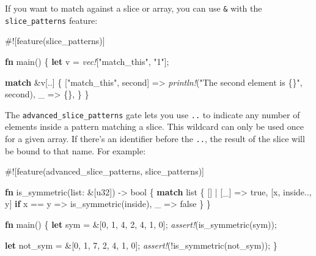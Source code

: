 \documentclass[a4paper,]{book}
\newenvironment{Shaded}{\begin{snugshade}}{\end{snugshade}}
\newcommand{\KeywordTok}[1]{\textcolor[rgb]{0.13,0.29,0.53}{\textbf{{#1}}}}
\newcommand{\DataTypeTok}[1]{\textcolor[rgb]{0.13,0.29,0.53}{{#1}}}
\newcommand{\DecValTok}[1]{\textcolor[rgb]{0.00,0.00,0.81}{{#1}}}
\newcommand{\ConstantTok}[1]{\textcolor[rgb]{0.00,0.00,0.00}{{#1}}}
\newcommand{\StringTok}[1]{\textcolor[rgb]{0.31,0.60,0.02}{{#1}}}
\newcommand{\PreprocessorTok}[1]{\textcolor[rgb]{0.56,0.35,0.01}{\textit{{#1}}}}
\newcommand{\AttributeTok}[1]{\textcolor[rgb]{0.77,0.63,0.00}{{#1}}}
\newcommand{\NormalTok}[1]{{#1}}
\begin{document}
If you want to match against a slice or array, you can use \texttt{\&}
with the \texttt{slice\_patterns} feature:

\begin{Shaded}
\begin{Highlighting}[]
\AttributeTok{#![}\NormalTok{feature}\AttributeTok{(}\NormalTok{slice_patterns}\AttributeTok{)]}

\KeywordTok{fn} \NormalTok{main() \{}
    \KeywordTok{let} \NormalTok{v = }\PreprocessorTok{vec!}\NormalTok{[}\StringTok{"match_this"}\NormalTok{, }\StringTok{"1"}\NormalTok{];}

    \KeywordTok{match} \NormalTok{&v[..] \{}
        \NormalTok{[}\StringTok{"match_this"}\NormalTok{, second] => }\PreprocessorTok{println!}\NormalTok{(}\StringTok{"The second element is \{\}"}\NormalTok{, second),}
        \NormalTok{_ => \{\},}
    \NormalTok{\}}
\NormalTok{\}}
\end{Highlighting}
\end{Shaded}

The \texttt{advanced\_slice\_patterns} gate lets you use \texttt{..} to
indicate any number of elements inside a pattern matching a slice. This
wildcard can only be used once for a given array. If there's an
identifier before the \texttt{..}, the result of the slice will be bound
to that name. For example:

\begin{Shaded}
\begin{Highlighting}[]
\AttributeTok{#![}\NormalTok{feature}\AttributeTok{(}\NormalTok{advanced_slice_patterns}\AttributeTok{,} \NormalTok{slice_patterns}\AttributeTok{)]}

\KeywordTok{fn} \NormalTok{is_symmetric(list: &[}\DataTypeTok{u32}\NormalTok{]) -> }\DataTypeTok{bool} \NormalTok{\{}
    \KeywordTok{match} \NormalTok{list \{}
        \NormalTok{[] | [_] => }\ConstantTok{true}\NormalTok{,}
        \NormalTok{[x, inside.., y] }\KeywordTok{if} \NormalTok{x == y => is_symmetric(inside),}
        \NormalTok{_ => }\ConstantTok{false}
    \NormalTok{\}}
\NormalTok{\}}

\KeywordTok{fn} \NormalTok{main() \{}
    \KeywordTok{let} \NormalTok{sym = &[}\DecValTok{0}\NormalTok{, }\DecValTok{1}\NormalTok{, }\DecValTok{4}\NormalTok{, }\DecValTok{2}\NormalTok{, }\DecValTok{4}\NormalTok{, }\DecValTok{1}\NormalTok{, }\DecValTok{0}\NormalTok{];}
    \PreprocessorTok{assert!}\NormalTok{(is_symmetric(sym));}

    \KeywordTok{let} \NormalTok{not_sym = &[}\DecValTok{0}\NormalTok{, }\DecValTok{1}\NormalTok{, }\DecValTok{7}\NormalTok{, }\DecValTok{2}\NormalTok{, }\DecValTok{4}\NormalTok{, }\DecValTok{1}\NormalTok{, }\DecValTok{0}\NormalTok{];}
    \PreprocessorTok{assert!}\NormalTok{(!is_symmetric(not_sym));}
\NormalTok{\}}
\end{Highlighting}
\end{Shaded}
\end{document}
